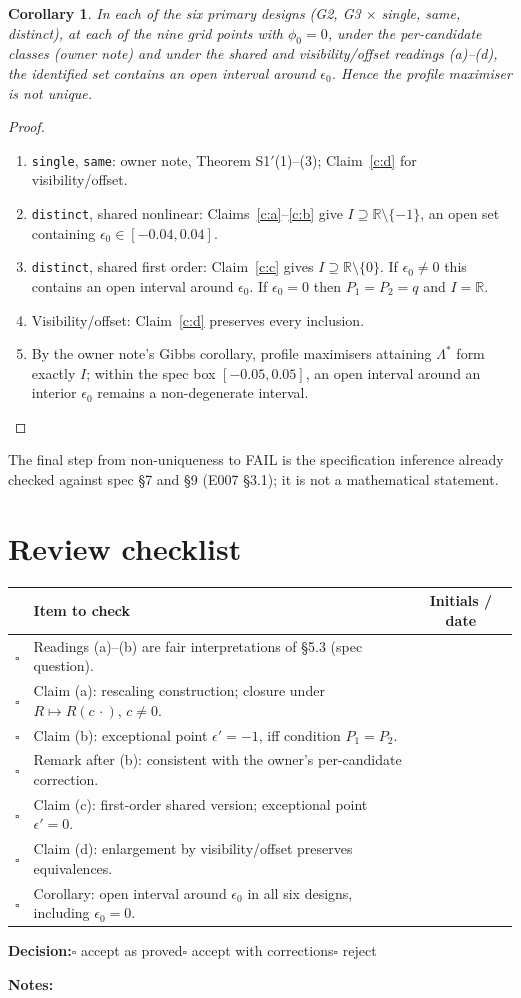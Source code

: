 \documentclass[11pt,a4paper]{article}
\theoremstyle{plain}
\newtheorem*{corollary}{Corollary}
\theoremstyle{definition}
\theoremstyle{remark}
\newcommand{\eps}{\epsilon}
\newcommand{\R}{\mathbb{R}}
\begin{document}
\begin{corollary}
In each of the six primary designs (G2, G3 $\times$ single, same, distinct), at each of the nine
grid points with $\phi_0=0$, under the per-candidate classes (owner note) and under the
shared and visibility/offset readings (a)--(d), the identified set contains an open interval
around $\eps_0$. Hence the profile maximiser is not unique.
\end{corollary}
\begin{proof}
\begin{enumerate}[label=\textbf{Step \arabic*.},leftmargin=*,itemsep=2pt]
\item \texttt{single}, \texttt{same}: owner note, Theorem S1$'$(1)--(3); Claim~\ref{c:d} for
visibility/offset.
\item \texttt{distinct}, shared nonlinear: Claims~\ref{c:a}--\ref{c:b} give
$I\supseteq\R\setminus\{-1\}$, an open set containing $\eps_0\in[-0.04,0.04]$.
\item \texttt{distinct}, shared first order: Claim~\ref{c:c} gives $I\supseteq\R\setminus\{0\}$.
If $\eps_0\neq0$ this contains an open interval around $\eps_0$. If $\eps_0=0$ then
$P_1=P_2=q$ and $I=\R$.
\item Visibility/offset: Claim~\ref{c:d} preserves every inclusion.
\item By the owner note's Gibbs corollary, profile maximisers attaining $\Lambda^*$ form
exactly $I$; within the spec box $[-0.05,0.05]$, an open interval around an interior
$\eps_0$ remains a non-degenerate interval.
\end{enumerate}
\end{proof}
The final step from non-uniqueness to FAIL is the specification inference already checked
against spec \S7 and \S9 (E007 \S3.1); it is not a mathematical statement.

\section{Review checklist}
\renewcommand{\arraystretch}{1.6}
\noindent\begin{tabularx}{\linewidth}{@{}c>{\raggedright\arraybackslash}Xc@{}}
\toprule
& Item to check & Initials / date \\
\midrule
$\square$ & Readings (a)--(b) are fair interpretations of \S5.3 (spec question). & \\
$\square$ & Claim (a): rescaling construction; closure under $R\mapsto R(c\,\cdot)$, $c\neq0$. & \\
$\square$ & Claim (b): exceptional point $\eps'=-1$, iff condition $P_1=P_2$. & \\
$\square$ & Remark after (b): consistent with the owner's per-candidate correction. & \\
$\square$ & Claim (c): first-order shared version; exceptional point $\eps'=0$. & \\
$\square$ & Claim (d): enlargement by visibility/offset preserves equivalences. & \\
$\square$ & Corollary: open interval around $\eps_0$ in all six designs, including $\eps_0=0$. & \\
\bottomrule
\end{tabularx}

\vspace{14pt}
\textbf{Decision:}\quad $\square$ accept as proved\quad $\square$ accept with corrections\quad $\square$ reject

\vspace{10pt}
\textbf{Notes:}
\end{document}

